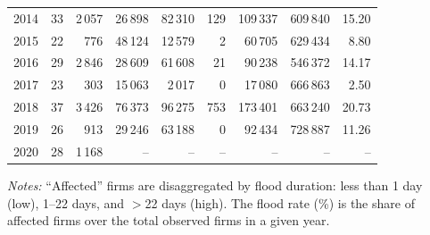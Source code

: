 \begin{table}[htbp]
{\begin{threeparttable}[b]
\begin{tabular}{l r r r r r r r r}
      2014 & 33 & 2\,057 & 26\,898 & 82\,310 & 129   & 109\,337 & 609\,840 & 15.20 \\
      2015 & 22 &   776 & 48\,124 & 12\,579 & 2     & 60\,705 & 629\,434 & 8.80 \\
      2016 & 29 & 2\,846 & 28\,609 & 61\,608 & 21    & 90\,238 & 546\,372 & 14.17 \\
      2017 & 23 &   303 & 15\,063 & 2\,017  & 0     & 17\,080 & 666\,863 & 2.50 \\
      2018 & 37 & 3\,426 & 76\,373 & 96\,275 & 753   & 173\,401 & 663\,240 & 20.73 \\
      2019 & 26 &   913 & 29\,246 & 63\,188 & 0     & 92\,434 & 728\,887 & 11.26 \\
      2020 & 28 & 1\,168 & -- & -- & -- & -- & -- & -- \\
      \bottomrule\bottomrule
    \end{tabular}
    \begin{tablenotes}[flushleft]
      \small
      \item \emph{Notes:} “Affected” firms are disaggregated by flood duration: less than 1 day (low), 1–22 days, and $>$22 days (high). The flood rate (\%) is the share of affected firms over the total observed firms in a given year.
    \end{tablenotes}
  \end{threeparttable}}
\end{table}
